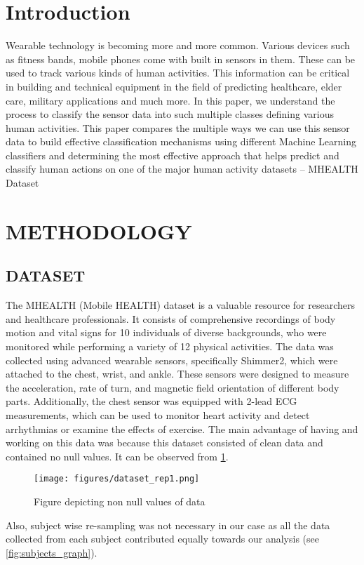 \documentclass[acmtog]{acmart}
\begin{document}
\section{Introduction}
Wearable technology is becoming more and more common. Various devices such as fitness bands, mobile phones come with built in sensors in them. These can be used to track various kinds of human activities. This information can be critical in building and technical equipment in the field of predicting healthcare, elder care, military applications and much more. In this paper, we understand the process to classify the sensor data into such multiple classes defining various human activities. This paper compares the multiple ways we can use this sensor data to build effective classification mechanisms using different Machine Learning classifiers and determining the most effective approach that helps predict and classify human actions on one of the major human activity datasets – MHEALTH Dataset

\section{METHODOLOGY}
\subsection{DATASET}
The MHEALTH (Mobile HEALTH) dataset is a valuable resource for researchers and healthcare professionals. It consists of comprehensive recordings of body motion and vital signs for 10 individuals of diverse backgrounds, who were monitored while performing a variety of 12 physical activities. The data was collected using advanced wearable sensors, specifically Shimmer2, which were attached to the chest, wrist, and ankle. These sensors were designed to measure the acceleration, rate of turn, and magnetic field orientation of different body parts. Additionally, the chest sensor was equipped with 2-lead ECG measurements, which can be used to monitor heart activity and detect arrhythmias or examine the effects of exercise. The main advantage of having and working on this data was because this dataset consisted of clean data and contained no null values. It can be observed from \cref{fig:dataset_rep1}.
\begin{figure}[H]
    \centering
    \texttt{[image: figures/dataset\_rep1.png]}
    \caption{Figure depicting non null values of data}
    \label{fig:dataset_rep1}
 \end{figure}
Also, subject wise re-sampling was not necessary in our case as all the data collected from each subject contributed equally towards our analysis (see \cref{fig:subjects_graph}).
\end{document}
